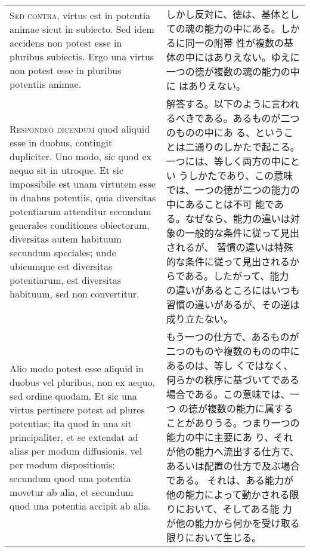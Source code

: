 \documentclass[10pt]{jsarticle}
\begin{document}
\begin{longtable}{p{21em}p{21em}}
\\

{\scshape Sed contra}, virtus est in potentia animae sicut in
subiecto. Sed idem accidens non potest esse in pluribus
subiectis. Ergo una virtus non potest esse in pluribus potentiis
animae.

&

しかし反対に、徳は、基体としての魂の能力の中にある。しかるに同一の附帯
性が複数の基体の中にはありえない。ゆえに一つの徳が複数の魂の能力の中に
はありえない。

\\

{\scshape Respondeo dicendum} quod aliquid esse in duobus, contingit
dupliciter. Uno modo, sic quod ex aequo sit in utroque. Et sic
impossibile est unam virtutem esse in duabus potentiis, quia
diversitas potentiarum attenditur secundum generales conditiones
obiectorum, diversitas autem habituum secundum speciales; unde
ubicumque est diversitas potentiarum, est diversitas habituum, sed non
convertitur.

&

解答する。以下のように言われるべきである。あるものが二つのものの中にあ
る、ということは二通りのしかたで起こる。一つには、等しく両方の中にとい
うしかたであり、この意味では、一つの徳が二つの能力の中にあることは不可
能である。なぜなら、能力の違いは対象の一般的な条件に従って見出されるが、
習慣の違いは特殊的な条件に従って見出されるからである。したがって、能力
の違いがあるところにはいつも習慣の違いがあるが、その逆は成り立たない。

\\

Alio modo potest esse aliquid in duobus vel pluribus, non ex aequo,
sed ordine quodam. Et sic una virtus pertinere potest ad plures
potentias; ita quod in una sit principaliter, et se extendat ad alias
per modum diffusionis, vel per modum dispositionis; secundum quod una
potentia movetur ab alia, et secundum quod una potentia accipit ab
alia.

&

もう一つの仕方で、あるものが二つのものや複数のものの中にあるのは、等し
くではなく、何らかの秩序に基づいてである場合である。この意味では、一つ
の徳が複数の能力に属することがありうる。つまり一つの能力の中に主要にあ
り、それが他の能力へ流出する仕方で、あるいは配置の仕方で及ぶ場合である。
それは、ある能力が他の能力によって動かされる限りにおいて、そしてある能
力が他の能力から何かを受け取る限りにおいて生じる。

\\


\end{longtable}
\end{document}
